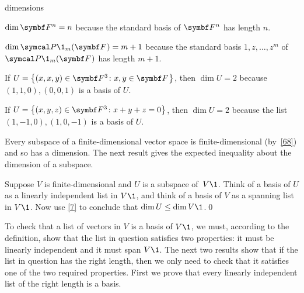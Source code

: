 \begin{example}{dimensions}
\begin{Itemize}
\item
$\dim \F{n} = n$ because the standard basis of $\F n$ has length $n$.
\item
$\dim \P\1_m(\F{}) = m + 1$ because the standard basis $1, z, \dots, z^m$ of $\P\1_m(\F{})$ has length $m+1$.
\item
If $U = \br[\big]{(x, x, y) \in \F{3} \colon x, y \in \F{}}$, then $\dim U = 2$ because $(1, 1, 0), (0, 0, 1) $ is a basis of $U$.
\item
If $U = \br[\big]{(x, y, z) \in \F{3} \colon x + y + z = 0}$, then $\dim U = 2$ because the list $(1, -1, 0), (1, 0, -1) $ is a basis of $U$.
\end{Itemize}
\exampleitemend
\end{example}

Every subspace of a finite-dimensional vector space is finite-dimensional (by~\ref{68}) and so has a dimension.  The next result
gives the expected inequality about the dimension of a subspace.


\proof
Suppose $V$ is finite-dimensional and $U$ is a subspace of~$V\1$. Think of a basis of $U$ as a linearly independent list in $V\1$, and think of a basis of $V$ as a spanning list in $V\1$. Now use \ref{7} to conclude that $\dim U \le \dim V\1$.\qed


To check that a list of vectors in $V$ is a basis of $V\1$, we must, according to the definition, show that the list in question satisfies two properties: it must be linearly independent and it must span $V\1$.  The next two results show that if the list in question has the right length, then we only need to check that it satisfies one of the two required properties. First we prove that every linearly independent list of the right length is a basis.


